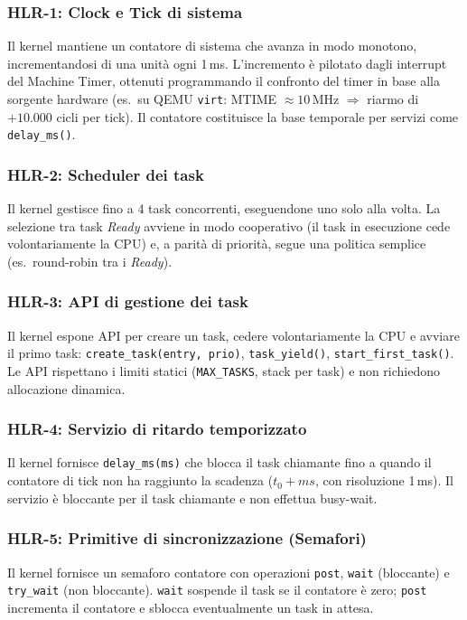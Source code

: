 \documentclass[italian, Lau, oneside]{sapthesis} %
\begin{document}
\subsubsection*{HLR-1: Clock e Tick di sistema}
Il kernel mantiene un contatore di sistema che avanza in modo monotono, incrementandosi di una unità ogni 1\,ms. L'incremento è pilotato dagli interrupt del Machine Timer, ottenuti programmando il confronto del timer in base alla sorgente hardware (es.\ su QEMU \texttt{virt}: MTIME $\approx 10$\,MHz $\Rightarrow$ riarmo di $+10{.}000$ cicli per tick). Il contatore costituisce la base temporale per servizi come \texttt{delay\_ms()}.

\subsubsection*{HLR-2: Scheduler dei task}
Il kernel gestisce fino a 4 task concorrenti, eseguendone uno solo alla volta. La selezione tra task \emph{Ready} avviene in modo cooperativo (il task in esecuzione cede volontariamente la CPU) e, a parità di priorità, segue una politica semplice (es.\ round-robin tra i \emph{Ready}).

\subsubsection*{HLR-3: API di gestione dei task}
Il kernel espone API per creare un task, cedere volontariamente la CPU e avviare il primo task: \texttt{create\_task(entry, prio)}, \texttt{task\_yield()}, \texttt{start\_first\_task()}. Le API rispettano i limiti statici (\texttt{MAX\_TASKS}, stack per task) e non richiedono allocazione dinamica.

\subsubsection*{HLR-4: Servizio di ritardo temporizzato}
Il kernel fornisce \texttt{delay\_ms(ms)} che blocca il task chiamante fino a quando il contatore di tick non ha raggiunto la scadenza (\(t_0 + ms\), con risoluzione 1\,ms). Il servizio è bloccante per il task chiamante e non effettua busy-wait.

\subsubsection*{HLR-5: Primitive di sincronizzazione (Semafori)}
Il kernel fornisce un semaforo contatore con operazioni \texttt{post}, \texttt{wait} (bloccante) e \texttt{try\_wait} (non bloccante). \texttt{wait} sospende il task se il contatore è zero; \texttt{post} incrementa il contatore e sblocca eventualmente un task in attesa.
\end{document}
